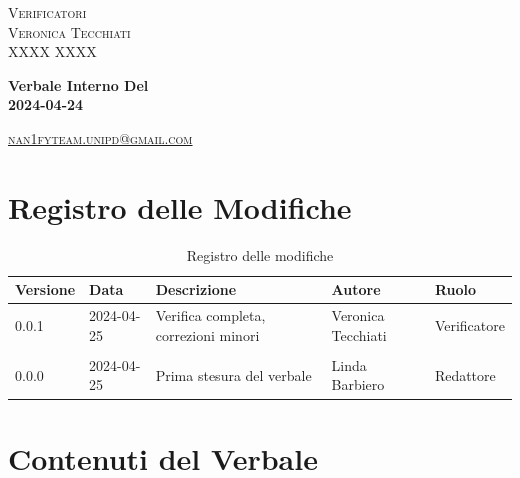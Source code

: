 \documentclass[8pt]{article}
\begin{document}
\begin{titlepage}
\begin{minipage}[t]{0.47\textwidth}
		{\large{\textsc{Verificatori}}
			\vspace{3mm}
			{\\\large{\textsc{Veronica Tecchiati}\\}} %
			{\large{\textsc{XXXX XXXX}}}
			
		}
		\vspace{4mm}\vspace{4mm}
	\end{minipage}
	\vspace{4cm}
	\begin{center}
		\begin{flushright}
			{\fontsize{30pt}{52pt}\selectfont \textbf{Verbale Interno Del\\2024-04-24\\}} %
		\end{flushright}
		\vspace{3cm}
	\end{center}
	\vspace{8 cm}
	{\small \textsc{\href{mailto: nan1fyteam.unipd@gmail.com}{nan1fyteam.unipd@gmail.com}}}
\end{titlepage}
\pagestyle{mystyle}
\section*{Registro delle Modifiche}
\begin{table}[ht!]	
	\centering
	\begin{tabular}{p{1.2cm} p{2cm} p{6cm} p{3cm} p{2cm}}
		\toprule
		\textbf{Versione}& \textbf{Data} & \textbf{Descrizione} & \textbf{Autore} & \textbf{Ruolo} \\
		\midrule
		  0.0.1 & 2024-04-25 & Verifica completa, correzioni minori & Veronica Tecchiati    & Verificatore \\\\ %
		0.0.0 & 2024-04-25 & Prima stesura del verbale & Linda Barbiero & Redattore \\
		\bottomrule
	\end{tabular}
	\caption{Registro delle modifiche}
	\label{table:Registro delle modifiche}
\end{table}
\newpage
\tableofcontents
\clearpage
\newpage
\justifying
\section{Contenuti del Verbale}
\end{document}
